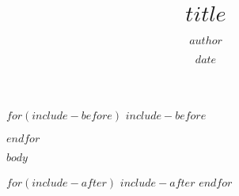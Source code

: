 \documentclass[12pt,a4paper]{book}
\author{$author$}
\title{$title$}
\date{$date$}
\begin{document}
\frontmatter
{}







$for(include-before)$
$include-before$

$endfor$

\tableofcontents
\listoffigures
\listoftables



\mainmatter

$body$

\printbibliography

\backmatter

$for(include-after)$
$include-after$
$endfor$
\end{document}
